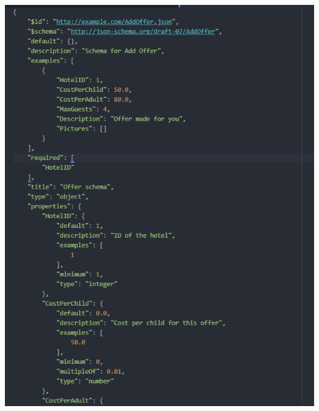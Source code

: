 \documentclass{article}
\begin{document}
\includegraphics[width=\linewidth]{Oferta-Hotel-Serwer/Offer_Add_JSON1.png}
\end{document}
